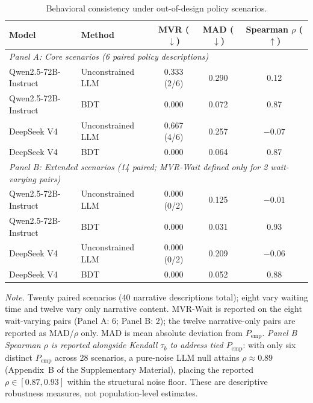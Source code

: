 \documentclass[11pt]{article}
\begin{document}
\begin{table}[t]
\centering
\caption{Behavioral consistency under out-of-design policy scenarios.}
\label{tab:out_of_design}
\small
\setlength{\tabcolsep}{4pt}
\begin{tabular}{@{}llccc@{}}
\toprule
Model & Method & MVR ($\downarrow$) & MAD ($\downarrow$) & Spearman $\rho$ ($\uparrow$)\\
\midrule

\multicolumn{5}{l}{\textit{Panel A: Core scenarios (6 paired policy descriptions)}}\\

Qwen2.5-72B-Instruct
& Unconstrained LLM
& 0.333 (2/6)
& 0.290
& 0.12 \\

Qwen2.5-72B-Instruct
& BDT
& 0.000
& 0.072
& 0.87 \\

DeepSeek V4
& Unconstrained LLM
& 0.667 (4/6)
& 0.257
& $-0.07$ \\

DeepSeek V4
& BDT
& 0.000
& 0.064
& 0.87 \\

\midrule

\multicolumn{5}{l}{\textit{Panel B: Extended scenarios (14 paired; MVR-Wait defined only for 2 wait-varying pairs)}}\\

Qwen2.5-72B-Instruct
& Unconstrained LLM
& 0.000 (0/2)
& 0.125
& $-0.01$ \\

Qwen2.5-72B-Instruct
& BDT
& 0.000
& 0.031
& 0.93 \\

DeepSeek V4
& Unconstrained LLM
& 0.000 (0/2)
& 0.209
& $-0.06$ \\

DeepSeek V4
& BDT
& 0.000
& 0.052
& 0.88 \\

\bottomrule
\end{tabular}

\vspace{0.4em}

\begin{minipage}{0.95\textwidth}
\small
\textit{Note.}
Twenty paired scenarios (40 narrative descriptions total); eight vary waiting time and twelve vary only narrative content. MVR-Wait is reported on the eight wait-varying pairs (Panel A: 6; Panel B: 2); the twelve narrative-only pairs are reported as MAD/$\rho$ only. MAD is mean absolute deviation from $P_{\text{emp}}$. \emph{Panel B Spearman $\rho$ is reported alongside Kendall $\tau_b$ to address tied $P_{\text{emp}}$}: with only six distinct $P_{\text{emp}}$ across 28 scenarios, a pure-noise LLM null attains $\rho \approx 0.89$ (Appendix~B of the Supplementary Material), placing the reported $\rho \in [0.87, 0.93]$ within the structural noise floor. These are descriptive robustness measures, not population-level estimates.
\end{minipage}
\end{table}
\end{document}
